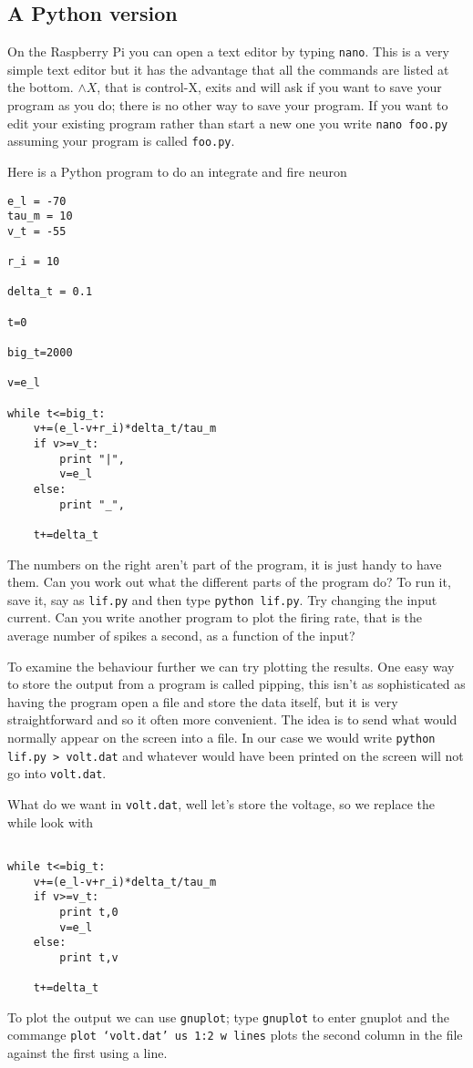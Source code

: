 \documentclass[11pt,a4paper]{scrartcl}
\begin{document}
\newpage

\subsection*{A Python version}

On the Raspberry Pi you can open a text editor by typing
\texttt{nano}. This is a very simple text editor but it has the
advantage that all the commands are listed at the bottom. $\wedge X$, that
is control-X, exits and will ask if you want to save your program as
you do; there is no other way to save your program. If you want to
edit your existing program rather than start a new one you write
\texttt{nano foo.py} assuming your program is called \texttt{foo.py}. 

Here is a Python program to do an integrate and fire neuron
\begin{lstlisting}[numbers=right]
e_l = -70
tau_m = 10
v_t = -55

r_i = 10

delta_t = 0.1

t=0

big_t=2000

v=e_l

while t<=big_t:
	v+=(e_l-v+r_i)*delta_t/tau_m
	if v>=v_t:
		print "|",
		v=e_l	
	else:
		print "_",

	t+=delta_t
\end{lstlisting}
The numbers on the right aren't part of the program, it is just handy
to have them. Can you work out what the different parts of the program
do? To run it, save it, say as \texttt{lif.py} and then type
\texttt{python lif.py}. Try changing the input current. Can you write
another program to plot the firing rate, that is the average number of
spikes a second, as a function of the input?

To examine the behaviour further we can try plotting the results. One
easy way to store the output from a program is called pipping, this
isn't as sophisticated as having the program open a file and store the
data itself, but it is very straightforward and so it often more
convenient. The idea is to send what would normally appear on the
screen into a file. In our case we would write \texttt{python lif.py >
  volt.dat} and whatever would have been printed on the screen will
not go into \texttt{volt.dat}. 

What do we want in \texttt{volt.dat}, well let's store the voltage, so we replace the while look with
\begin{lstlisting}

while t<=big_t:
	v+=(e_l-v+r_i)*delta_t/tau_m
	if v>=v_t:
		print t,0
		v=e_l	
	else:
		print t,v

	t+=delta_t

\end{lstlisting}

To plot the output we can use \texttt{gnuplot}; type \texttt{gnuplot}
to enter gnuplot and the commange \texttt{plot \lq{}volt.dat\rq{} us
  1:2 w lines} plots the second column in the file against the first
using a line.
\end{document}
